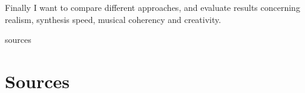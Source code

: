 \documentclass[11pt,a4paper]{article}
\begin{document}
Finally I want to compare different approaches, and evaluate results concerning realism, synthesis speed, musical coherency and creativity.



\begin{btSect}{sources} %
\section*{Sources}
\btPrintCited
\end{btSect}
\end{document}
